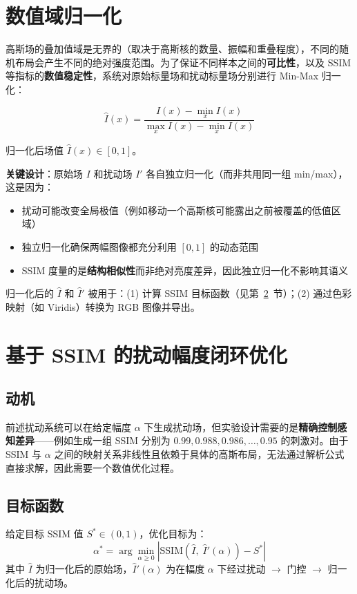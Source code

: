 \documentclass{article}
\begin{document}
\section{数值域归一化}
\label{sec:normalization}

高斯场的叠加值域是无界的（取决于高斯核的数量、振幅和重叠程度），不同的随机布局会产生不同的绝对强度范围。为了保证不同样本之间的\textbf{可比性}，以及 SSIM 等指标的\textbf{数值稳定性}，系统对原始标量场和扰动标量场分别进行 Min-Max 归一化：

\begin{equation}
\hat{I}(x) = \frac{I(x) - \min_x I(x)}{\max_x I(x) - \min_x I(x)}
\end{equation}

归一化后场值 $\hat{I}(x) \in [0, 1]$。

\textbf{关键设计}：原始场 $I$ 和扰动场 $I'$ 各自独立归一化（而非共用同一组 min/max），这是因为：
\begin{itemize}
    \item 扰动可能改变全局极值（例如移动一个高斯核可能露出之前被覆盖的低值区域）
    \item 独立归一化确保两幅图像都充分利用 $[0, 1]$ 的动态范围
    \item SSIM 度量的是\textbf{结构相似性}而非绝对亮度差异，因此独立归一化不影响其语义
\end{itemize}

归一化后的 $\hat{I}$ 和 $\hat{I}'$ 被用于：(1) 计算 SSIM 目标函数（见第~\ref{sec:optimization}~节）；(2) 通过色彩映射（如 Viridis）转换为 RGB 图像并导出。


\section{基于 SSIM 的扰动幅度闭环优化}
\label{sec:optimization}

\subsection{动机}
前述扰动系统可以在给定幅度 $\alpha$ 下生成扰动场，但实验设计需要的是\textbf{精确控制感知差异}——例如生成一组 SSIM 分别为 $0.99, 0.988, 0.986, \dots, 0.95$ 的刺激对。由于 SSIM 与 $\alpha$ 之间的映射关系非线性且依赖于具体的高斯布局，无法通过解析公式直接求解，因此需要一个数值优化过程。

\subsection{目标函数}
给定目标 SSIM 值 $S^* \in (0, 1)$，优化目标为：
\begin{equation}
\alpha^* = \arg\min_{\alpha \geq 0} \left| \text{SSIM}\!\left(\hat{I},\; \hat{I}'(\alpha)\right) - S^* \right|
\end{equation}
其中 $\hat{I}$ 为归一化后的原始场，$\hat{I}'(\alpha)$ 为在幅度 $\alpha$ 下经过扰动 $\to$ 门控 $\to$ 归一化后的扰动场。
\end{document}
